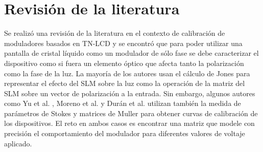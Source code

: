 \section{Revisión de la literatura}
Se realizó una revisión de la literatura en el contexto de calibración
de moduladores basados en TN-LCD y se encontró que para poder utilizar
una pantalla de cristal líquido como un modulador de sólo fase se debe
caracterizar el dispositivo como si fuera un elemento óptico que
afecta tanto la polarización como la fase de la luz. La mayoría de los
autores usan el cálculo de Jones para representar el efecto del SLM
sobre la luz como la operación de la matriz del SLM sobre un vector de
polarización a la entrada. Sin embargo, algunos autores como Yu et al.  , Moreno et
al.  y Durán et al.  utilizan también
la medida de parámetros de  Stokes y matrices de Muller para obtener
curvas de calibración de los dispositivos. El reto en ambos casos es
encontrar una matriz que 
modele con precisión el comportamiento del modulador para diferentes
valores de voltaje aplicado. 


